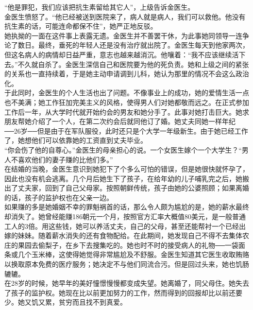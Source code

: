 “他是罪犯，我们应该把抗生素留给其它人”，上级告诉金医生。\\

金医生愤怒了。“他已经被送到医院来了，病人就是病人，我们可以救他。他没有抗生素的话，可能连命都保不住”，她严正地反驳。\\

她执拗的一面在这件事上表露无遗。金医生并不善罢干休，为此事她同领导一连争论了数日。最终，垂死的年轻人还是没有治疗就出院了。金医生每天到他家两次，但这名病人的病情却日益严重，意志也越来越消沉。他嚷着：“我不应该继续活下去。”不久就自杀了。金医生深信自己和医院要为他的死负责。她和上级之间的紧张的关系也一直持续着，于是她主动申请调到儿科，她认为那里的情况不会这么政治化。\\

于此同时，金医生的个人生活也出了问题。不像事业上的成功，她的爱情生活一点也不美满；她工作狂加完美主义的风格，使得男人们对她都敬而远之。在正式参加工作后一年，从大学时代就开始约会的男友和她分手了。此事对她打击巨大。她求朋友帮她介绍了一个人，在第二次约会后就同他订了婚。她丈夫同她一样年纪──26岁──但是由于在军队服役，此时还只是个大学一年级新生。由于她已经工作了，她想他们可以依靠她的工资直到丈夫毕业。\\

“你会伤了他的自尊心。”金医生的母亲担心的说。一个女医生嫁个一个大学生？“男人不喜欢他们的妻子赚的比他们多。”\\

在结婚的当晚，金医生意识到她犯下了个多么可怕的错误，但是她很快就怀孕了，因此也没有机会逃离。几个月后她生下了孩子，在给年幼的儿子哺乳完之后，她搬出了丈夫家，回到了自己父母家。按照朝鲜传统，孩子由她的公婆照顾；如果离婚的话，孩子的监护权也在父亲一边。\\

如果赚的多是她婚姻不幸的罪魁祸首的话，那么令人颇为尴尬的是，她的薪水最终却消失了。她曾经能赚186朝元一个月，按照官方汇率大概值80美元，是一般普通工人的3倍。用这些钱，她可以养活丈夫，自己的父母，甚至还能帮衬一个已经出嫁的妹妹。随着薪水消失的还有食物配给。在此期间，她发现自己不得不去集体农庄的果园去偷梨子，在乡下去搜集吃的。她也时不时的接受病人的礼物──一袋面条或几个玉米棒，这使得她觉得非常尴尬及不舒服。金医生知道其它医生收取贿赂以换取原本免费的医疗服务；她决定不与他们同流合污。但是回过头来，她也饥肠辘辘。\\

在28岁的时候，她早年的美好憧憬慢慢都变成失望。她离婚了，同父母住。她失去了孩子的监护权。她现在比以前更加努力的工作，然而得到的回报却比以前还要少。她又饥又累，贫穷而且找不到真爱。\\

